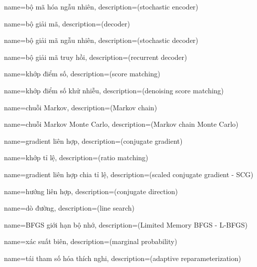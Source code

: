 {
    name={bộ mã hóa ngẫu nhiên},
    description={(stochastic encoder)}
}

{
    name={bộ giải mã},
    description={(decoder)}
}

{
    name={bộ giải mã ngẫu nhiên},
    description={(stochastic decoder)}
}

{
    name={bộ giải mã truy hồi},
    description={(recurrent decoder)}
}

{
    name={khớp điểm số},
    description={(score matching)}
}

{
    name={khớp điểm số khử nhiễu},
    description={(denoising score matching)}
}

{
    name={chuỗi Markov},
    description={(Markov chain)}
}

{
    name={chuỗi Markov Monte Carlo},
    description={(Markov chain Monte Carlo)}
}

{
    name={gradient liên hợp},
    description={(conjugate gradient)}
}

{
    name={khớp tỉ lệ},
    description={(ratio matching)}
}

{
    name={gradient liên hợp chia tỉ lệ},
    description={(scaled conjugate gradient - SCG)}
}

{
    name={hướng liên hợp},
    description={(conjugate direction)}
}

{
    name={dò đường},
    description={(line search)}
}


{
    name={BFGS giới hạn bộ nhớ},
    description={(Limited Memory BFGS - L-BFGS)}
}


{
    name={xác suất biên},
    description={(marginal probability)}
}

{
    name={tái tham số hóa thích nghi},
    description={(adaptive reparameterization)}
}

